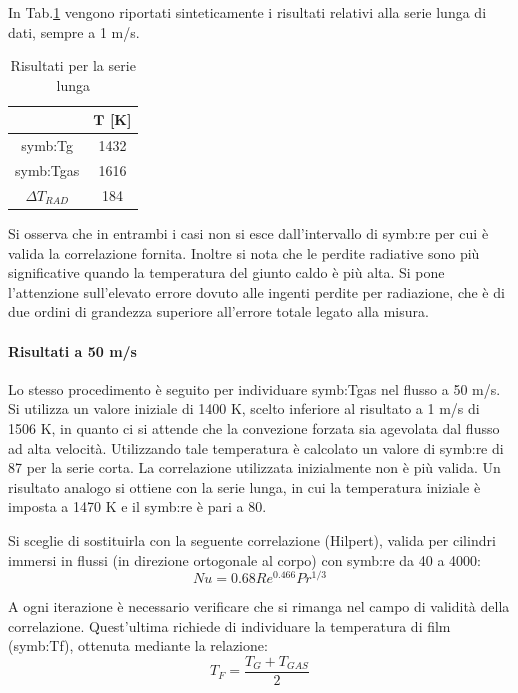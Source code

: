 In Tab.\ref{tab:risultatilong1} vengono riportati sinteticamente i risultati relativi alla serie lunga di dati, sempre a 1 m/s.

\begin{table}[H]
	\centering
	\begin{tabular}{c|c}
		\toprule
		\toprule
		         & $\bm{T}$ [K]\\
		\midrule
		\midrule
		\gls{symb:Tg} & 1432 \\
		\midrule
		\gls{symb:Tgas} & 1616 \\
		\midrule
		$\Delta T_{\textit{RAD}}$ & 184 \\
		\bottomrule
		\bottomrule	
	\end{tabular}
\caption{Risultati per la serie lunga}
\label{tab:risultatilong1}
\end{table}

Si osserva che in entrambi i casi non si esce dall'intervallo di \gls{symb:re} per cui è valida la correlazione fornita. Inoltre si nota che le perdite radiative sono più significative quando la temperatura del giunto caldo è più alta. Si pone l'attenzione sull'elevato errore dovuto alle ingenti perdite per radiazione, che è di due ordini di grandezza superiore all'errore totale legato alla misura. 

\paragraph{Risultati a 50 m/s}
Lo stesso procedimento è seguito per individuare \gls{symb:Tgas} nel flusso a 50 m/s. Si utilizza un valore iniziale di 1400 K, scelto inferiore al risultato a 1 m/s di 1506 K, in quanto ci si attende che la convezione forzata sia agevolata dal flusso ad alta velocità. Utilizzando tale temperatura è calcolato un valore di \gls{symb:re} di 87 per la serie corta. La correlazione utilizzata inizialmente non è più valida. Un risultato analogo si ottiene con la serie lunga, in cui la temperatura iniziale è imposta a 1470 K e il \gls{symb:re} è pari a 80.

Si sceglie di sostituirla con la seguente correlazione (Hilpert), valida per cilindri immersi in flussi (in direzione ortogonale al corpo) con \gls{symb:re} da 40 a 4000:
\begin{equation}
	Nu = 0.68 Re^{0.466}Pr^{1/3}
\end{equation}



A ogni iterazione è necessario verificare che si rimanga nel campo di validità della correlazione. Quest'ultima richiede di individuare la temperatura di film (\gls{symb:Tf}), ottenuta mediante la relazione: 
\begin{equation}
	T_F=\frac{T_G+T_{\textit{GAS}}}{2}
\end{equation}

